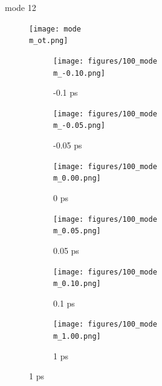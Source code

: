 \documentclass{beamer}
\newcommand\w{0.32}
\begin{document}
\renewcommand\m{12}
\begin{frame}{mode \m}
		\vspace{\vh mm}
	\begin{figure}
		\centering
		\texttt{[image: mode\\m\_ot.png]}
	\end{figure}
	\begin{figure}
		\centering
		\begin{subfigure}[b]{\w\textwidth}
			\centering
			\texttt{[image: figures/100\_mode\\m\_-0.10.png]}
			\caption{-0.1 ps}
		\end{subfigure}
		\begin{subfigure}[b]{\w\textwidth}
			\centering
			\texttt{[image: figures/100\_mode\\m\_-0.05.png]}
			\caption{-0.05 ps}
		\end{subfigure}
		\begin{subfigure}[b]{\w\textwidth}
			\centering
			\texttt{[image: figures/100\_mode\\m\_0.00.png]}
			\caption{0 ps}
		\end{subfigure}
		\begin{subfigure}[b]{\w\textwidth}
			\centering
			\texttt{[image: figures/100\_mode\\m\_0.05.png]}
			\caption{0.05 ps}
		\end{subfigure}
		\begin{subfigure}[b]{\w\textwidth}
			\centering
			\texttt{[image: figures/100\_mode\\m\_0.10.png]}
			\caption{0.1 ps}
		\end{subfigure}
		\begin{subfigure}[b]{\w\textwidth}
			\centering
			\texttt{[image: figures/100\_mode\\m\_1.00.png]}
			\caption{1 ps}
		\end{subfigure}
	\end{figure}
\end{frame}
\end{document}
